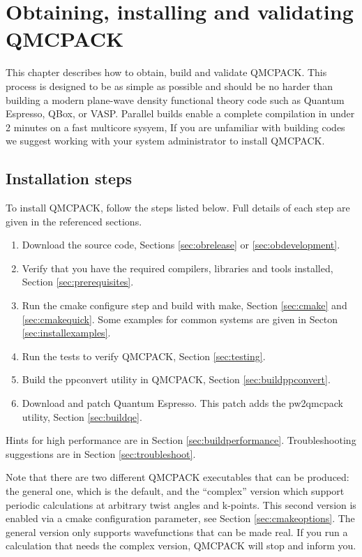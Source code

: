 \chapter{Obtaining, installing and validating QMCPACK}
\label{chap:obtaininginstalling}

This chapter describes how to obtain, build and validate QMCPACK. This process is designed to be as simple as
possible and should be no harder than building a modern plane-wave density
functional theory code such as Quantum Espresso, QBox, or
VASP. Parallel builds enable a complete
compilation in under 2 minutes on a fast multicore sysyem, If you
are unfamiliar with building codes we suggest working with your system
administrator to install QMCPACK.

\section{Installation steps}
To install QMCPACK, follow the steps listed below. Full details of
each step are given in the referenced sections.
\begin{enumerate}
\item Download the source code, Sections \ref{sec:obrelease} or \ref{sec:obdevelopment}.
\item Verify that you have the required compilers, libraries and tools
  installed, Section \ref{sec:prerequisites}.
\item Run the cmake configure step and build with make, Section
  \ref{sec:cmake} and \ref{sec:cmakequick}. Some examples for common
  systems are given in Secton \ref{sec:installexamples}.
\item Run the tests to verify QMCPACK, Section \ref{sec:testing}.
\item Build the ppconvert utility in QMCPACK, Section \ref{sec:buildppconvert}.
\item Download and patch Quantum Espresso. This patch adds the
  pw2qmcpack utility, Section \ref{sec:buildqe}.
\end{enumerate}

Hints for high performance are in Section \ref{sec:buildperformance}. Troubleshooting suggestions are in Section \ref{sec:troubleshoot}.

Note that there are two different QMCPACK executables that can be
produced: the general one, which is the default, and the ``complex''
version which support periodic calculations at arbitrary twist angles and
k-points. This second version is enabled via a cmake configuration
parameter, see Section \ref{sec:cmakeoptions}. The general version
only supports wavefunctions that can be made real. If you run a
calculation that needs the complex version, QMCPACK will stop and inform you.

